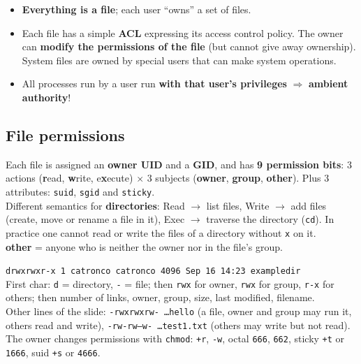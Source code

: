 \begin{propbox}[title=UNIX security architecture]
\begin{itemize}
  \item \textbf{Everything is a file}; each user ``owns'' a set of files.
  \item Each file has a simple \textbf{ACL} expressing its access control policy. The
        owner can \textbf{modify the permissions of the file} (but cannot give away
        ownership). System files are owned by special users that can make system
        operations.
  \item All processes run by a user run \textbf{with that user's privileges}
        $\Rightarrow$ \textbf{ambient authority}!
\end{itemize}
\end{propbox}

\subsection{File permissions}

\begin{defnbox}[title=UNIX file ACLs]
Each file is assigned an \textbf{owner UID} and a \textbf{GID}, and has \textbf{9
permission bits}: 3 actions (\textbf{r}ead, \textbf{w}rite, e\textbf{x}ecute) $\times$ 3
subjects (\textbf{owner}, \textbf{group}, \textbf{other}). Plus 3 attributes:
\texttt{suid}, \texttt{sgid} and \texttt{sticky}. \\
Different semantics for \textbf{directories}: Read $\to$ list files, Write $\to$ add
files (create, move or rename a file in it), Exec $\to$ traverse the directory (\texttt{cd}).
In practice one cannot read or write the files of a directory without \texttt{x} on it. \\
\textbf{other} = anyone who is neither the owner nor in the file's group.
\end{defnbox}

\begin{exbox}[title=Reading \texttt{ls -l}]
\texttt{drwxrwxr-x 1 catronco catronco 4096 Sep 16 14:23 exampledir} \\
First char: \texttt{d} = directory, \texttt{-} = file; then \texttt{rwx} for owner,
\texttt{rwx} for group, \texttt{r-x} for others; then number of links, owner, group,
size, last modified, filename. \\
Other lines of the slide: \texttt{-rwxrwxrw- \ldots hello} (a file, owner and group may run it,
others read and write), \texttt{-rw-rw--w- \ldots test1.txt} (others may write but not
read). \\
The owner changes permissions with \texttt{chmod}: \texttt{+r}, \texttt{-w},
octal \texttt{666}, \texttt{662}, sticky \texttt{+t} or \texttt{1666}, suid
\texttt{+s} or \texttt{4666}.
\end{exbox}

